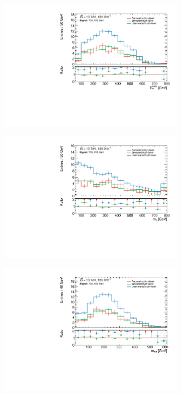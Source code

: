   \begin{figure}
	\centering
	\begin{subfigure}[b]{0.45\linewidth}
		\centering\includegraphics[width=\textwidth]{met_C1N2_Wh_hbb_700p0_150p0_smeared.pdf}
	\end{subfigure}\hfill
	\begin{subfigure}[b]{0.45\linewidth}
		\centering\includegraphics[width=\textwidth]{mt_C1N2_Wh_hbb_700p0_150p0_smeared.pdf}
	\end{subfigure}\hfill
	\begin{subfigure}[b]{0.45\linewidth}
		\centering\includegraphics[width=\textwidth]{mct_C1N2_Wh_hbb_700p0_150p0_smeared.pdf}

\end{subfigure}
\end{figure}
